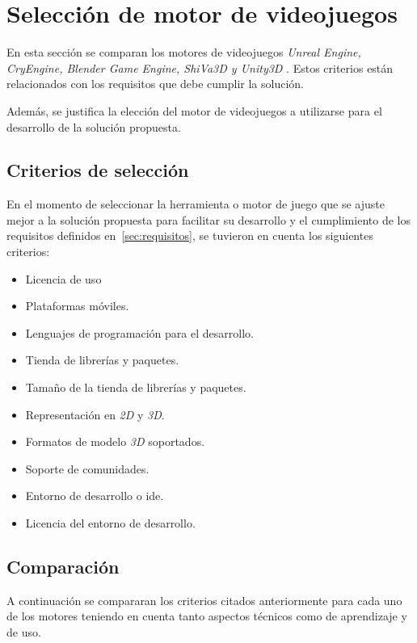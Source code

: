 \section{Selección de motor de videojuegos}
\label{sec:seleccion_plataforma}

En esta sección se comparan los motores de videojuegos \textit{Unreal Engine,
    CryEngine, Blender Game Engine, ShiVa3D y Unity3D} . Estos criterios están relacionados con los requisitos que debe
cumplir la solución.

Además, se justifica la elección del motor de videojuegos a utilizarse para 
el desarrollo de la solución propuesta.

\subsection{Criterios de selección}

En el momento de seleccionar la herramienta o motor de juego que se ajuste mejor
a la solución propuesta para facilitar su desarrollo y el cumplimiento de los
requisitos definidos en~\ref{sec:requisitos}, se tuvieron en cuenta los
siguientes criterios:

\begin{itemize}
\item Licencia de uso
\item Plataformas móviles.
\item Lenguajes de programación para el desarrollo.
\item Tienda de librerías y paquetes.
\item Tamaño de la tienda de librerías y paquetes.
\item Representación en \textit{2D} y \textit{3D}.
\item Formatos de modelo \textit{3D} soportados.
\item Soporte de comunidades.
\item Entorno de desarrollo o \Gls{ide}.
\item Licencia del entorno de desarrollo.
\end{itemize}


\subsection{Comparación}

A continuación se compararan los criterios citados anteriormente para cada uno
de los motores teniendo en cuenta tanto aspectos técnicos como de aprendizaje y
de uso.

